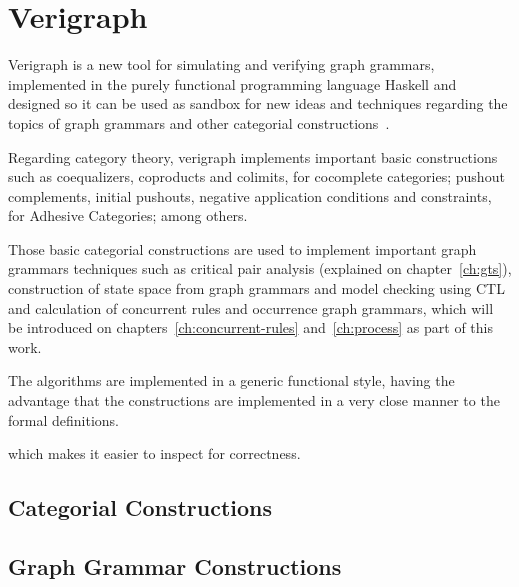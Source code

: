 \chapter{Verigraph}\label{ch:verigraph}

Verigraph is a new tool for simulating and verifying graph grammars, implemented in the purely functional programming language Haskell and designed so it can be used as sandbox for new ideas and techniques regarding the topics of graph grammars and other categorial constructions~\cite{BezerraETMF2016,Costa2016,CostaETMF2016, Becker2014}.

Regarding category theory, verigraph implements important basic constructions such as coequalizers, coproducts and colimits, for cocomplete categories; pushout complements, initial pushouts, negative application conditions and constraints, for Adhesive Categories; among others.

Those basic categorial constructions are used to implement important graph grammars techniques such as critical pair analysis (explained on chapter~\ref{ch:gts}), construction of state space from graph grammars and model checking using CTL  and calculation of concurrent rules and occurrence graph grammars, which will be introduced on chapters~\ref{ch:concurrent-rules} and~\ref{ch:process} as part of this work.

The algorithms are implemented in a generic functional style, having the advantage that the constructions are implemented in a very close manner to the formal definitions.  

which makes it easier to inspect for correctness.


\section{Categorial Constructions}

\section{Graph Grammar Constructions}
